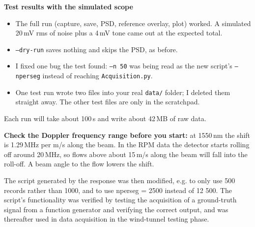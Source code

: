 \begin{tcolorbox}[breakable, colback=gray!4, colframe=gray!50,
 	boxrule=0.4pt, arc=2pt, fontupper=\small,
 	left=6pt, right=6pt, top=4pt, bottom=4pt]
 	\textbf{Test results with the simulated scope}
 	\begin{itemize}
 		\item The full run (capture, save, PSD, reference overlay, plot) worked. A simulated 20\,mV rms of noise plus a 4\,mV tone came out at the expected total.
 		\item \texttt{--dry-run} saves nothing and skips the PSD, as before.
 		\item I fixed one bug the test found: \texttt{--n 50} was being read as the new script's \texttt{--nperseg} instead of reaching \texttt{Acquisition.py}.
 		\item One test run wrote two files into your real \texttt{data/} folder; I deleted them straight away. The other test files are only in the scratchpad.
 	\end{itemize}
 	
 	Each run will take about 100\,s and write about 42\,MB of raw data.
 	
 	\textbf{Check the Doppler frequency range before you start:} at 1550\,nm the shift is 1.29\,MHz per m/s along the beam. In the RPM data the detector starts rolling off around 20\,MHz, so flows above about 15\,m/s along the beam will fall into the roll-off. A beam angle to the flow lowers the shift.
 \end{tcolorbox}
 
 The script generated by the response was then modified, e.g. to only use 500 records rather than 1000, and to use nperseg = 2500 instead of 12 500. The script's functionality was verified by testing the acquisition of a ground-truth signal from a function generator and verifying the correct output, and was thereafter used in data acquisition in the wind-tunnel testing phase. 
